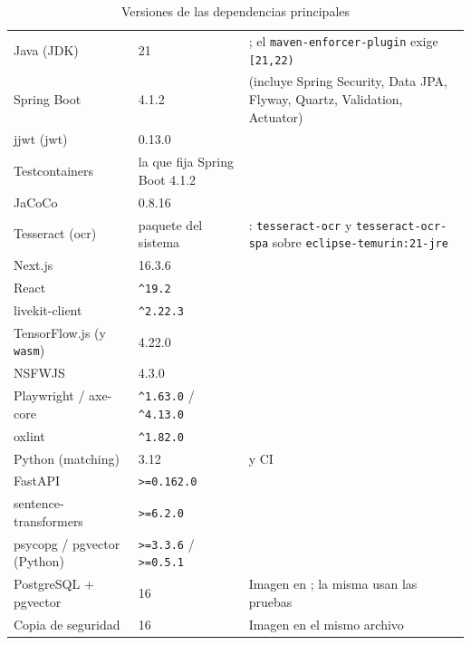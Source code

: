 \begin{table}[H]
    \centering
    \caption{Versiones de las dependencias principales}
    \label{tab:versiones-stack}
    \small
    \begin{tabularx}{\textwidth}{l l L}
        \toprule
         &  &  \\
        \midrule
        Java (JDK) & 21 & ; el \texttt{maven-enforcer-plugin} exige \texttt{[21,22)} \\
        Spring Boot & 4.1.2 &  (incluye Spring Security, Data JPA, Flyway, Quartz, Validation, Actuator) \\
        jjwt (\gls{jwt}) & 0.13.0 &  \\
        Testcontainers & la que fija Spring Boot 4.1.2 &  \\
        JaCoCo & 0.8.16 &  \\
        Tesseract (\gls{ocr}) & paquete del sistema & : \texttt{tesseract-ocr} y \texttt{tesseract-ocr-spa} sobre \texttt{eclipse-temurin:21-jre} \\
        Next.js & 16.3.6 &  \\
        React & \texttt{\^{}19.2} &  \\
        livekit-client & \texttt{\^{}2.22.3} &  \\
        TensorFlow.js (y \texttt{wasm}) & 4.22.0 &  \\
        NSFWJS & 4.3.0 &  \\
        Playwright / axe-core & \texttt{\^{}1.63.0} / \texttt{\^{}4.13.0} &  \\
        oxlint & \texttt{\^{}1.82.0} &  \\
        Python (\gls{matching}) & 3.12 &  y CI \\
        FastAPI & \texttt{>=0.162.0} &  \\
        sentence-transformers & \texttt{>=6.2.0} &  \\
        psycopg / pgvector (Python) & \texttt{>=3.3.6} / \texttt{>=0.5.1} &  \\
        PostgreSQL + pgvector & 16 & Imagen  en ; la misma usan las pruebas \\
        Copia de seguridad & 16 & Imagen  en el mismo archivo \\
        \bottomrule
    \end{tabularx}
\end{table}

